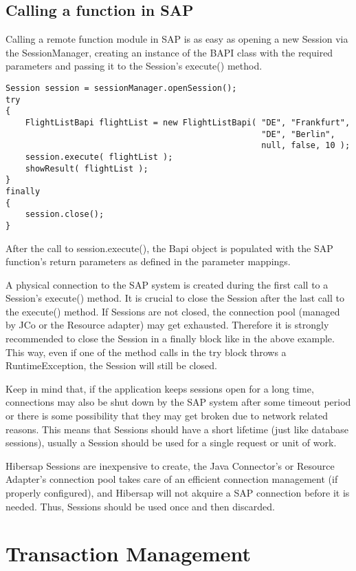 \subsection{Calling a function in SAP}

Calling a remote function module in SAP is as easy as opening a new Session via the SessionManager, creating an instance of the BAPI class with the required parameters and passing it to the Session's execute() method.

\begin{lstlisting}[caption=Executing the BAPI function]
Session session = sessionManager.openSession();
try
{
    FlightListBapi flightList = new FlightListBapi( "DE", "Frankfurt", 
                                                    "DE", "Berlin", 
                                                    null, false, 10 );
    session.execute( flightList );
    showResult( flightList );
}
finally
{
    session.close();
}
\end{lstlisting}

After the call to session.execute(), the Bapi object is populated with the SAP function's return parameters as 
defined in the parameter mappings.

A physical connection to the SAP system is created during the first call to a Session's execute() method. 
It is crucial to close the Session after the last call to the execute() method. If Sessions are not
closed, the connection pool (managed by JCo or the Resource adapter) may get exhausted. 
Therefore it is strongly recommended to close the Session in a
finally block like in the above example. This way, even if one of the method calls in the try block throws
a RuntimeException, the Session will still be closed.
 
Keep in mind that, if the application keeps sessions open for a long time, connections may also be shut down 
by the SAP system after some timeout period or there is some possibility that they may get broken due to network related reasons. 
This means that Sessions should have a short lifetime (just like database sessions), usually a Session should 
be used for a single request or unit of work.  

Hibersap Sessions are inexpensive to create, the Java Connector's or Resource Adapter's connection pool takes care of 
an efficient connection management (if properly configured), and Hibersap will not akquire a 
SAP connection before it is needed. Thus, Sessions should be used once and then discarded.  

\section{Transaction Management} 

